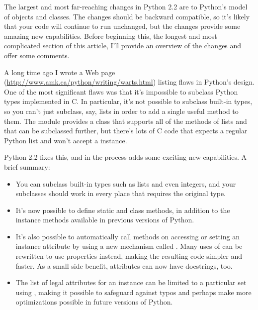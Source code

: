 \documentclass{howto}
\begin{document}
The largest and most far-reaching changes in Python 2.2 are to
Python's model of objects and classes.  The changes should be backward
compatible, so it's likely that your code will continue to run
unchanged, but the changes provide some amazing new capabilities.
Before beginning this, the longest and most complicated section of
this article, I'll provide an overview of the changes and offer some
comments.

A long time ago I wrote a Web page
(\url{http://www.amk.ca/python/writing/warts.html}) listing flaws in
Python's design.  One of the most significant flaws was that it's
impossible to subclass Python types implemented in C.  In particular,
it's not possible to subclass built-in types, so you can't just
subclass, say, lists in order to add a single useful method to them.
The  module provides a class that supports all of the
methods of lists and that can be subclassed further, but there's lots
of C code that expects a regular Python list and won't accept a
 instance.

Python 2.2 fixes this, and in the process adds some exciting new
capabilities.  A brief summary:

\begin{itemize}

\item You can subclass built-in types such as lists and even integers,
and your subclasses should work in every place that requires the
original type.

\item It's now possible to define static and class methods, in addition
to the instance methods available in previous versions of Python.

\item It's also possible to automatically call methods on accessing or
setting an instance attribute by using a new mechanism called
.  Many uses of  can be rewritten
to use properties instead, making the resulting code simpler and
faster.  As a small side benefit, attributes can now have docstrings,
too.

\item The list of legal attributes for an instance can be limited to a
particular set using , making it possible to safeguard
against typos and perhaps make more optimizations possible in future
versions of Python.

\end{itemize}
\end{document}
